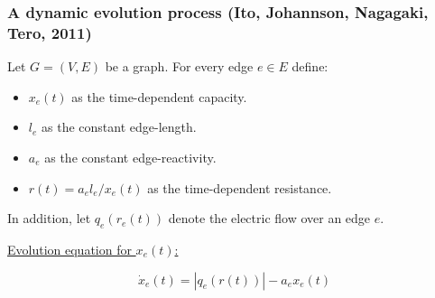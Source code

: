 \documentclass[	hyperref={pdfpagelabels=false}, xcolor=dvipsnames,
		11pt]{beamer}
\begin{document}
\begin{frame}
    \frametitle{A dynamic evolution process {\footnotesize(Ito, Johannson, Nagagaki, Tero, 2011)}} 

	Let $G = (V,E)$ be a graph. For every edge $e \in E$ define:
	     
	\begin{itemize}
	  \item $x_e(t)$ as the time-dependent capacity. 
	  \item $l_e$ as the constant edge-length. 
	  \item $a_e$ as the constant edge-reactivity. 
	  \item $r(t) = a_e l_e / x_e(t)$ as the time-dependent resistance.
	\end{itemize}  

        In addition, let $q_e(r_e(t))$ denote the electric flow over an edge $e$. 

	  \begin{alertblock}{\underline{Evolution equation for $x_e(t)$:}}
	  
	  \vspace{-0.5cm}
	  \begin{equation}  
	    \dot{x}_e(t) = |q_e(r(t))| - a_e x_e(t)  \nonumber
	  \end{equation}
	  \end{alertblock}
 
    


\end{frame}

\end{document}
